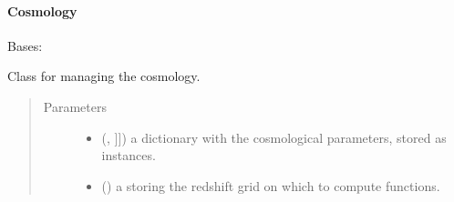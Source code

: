\documentclass[letterpaper,10pt,english]{sphinxmanual}
\begin{document}
\paragraph{Cosmology}
\label{\detokenize{api/seyfert.cosmology.cosmology.Cosmology:cosmology}}\label{\detokenize{api/seyfert.cosmology.cosmology.Cosmology::doc}}

\begin{fulllineitems}
\label{\detokenize{api/seyfert.cosmology.cosmology.Cosmology:seyfert.cosmology.cosmology.Cosmology}}
\sphinxAtStartPar
Bases: 

\sphinxAtStartPar
Class for managing the cosmology.
\begin{quote}\begin{description}
\item[{Parameters}] \leavevmode\begin{itemize}
\item {} 
\sphinxAtStartPar
{} (\sphinxcode{\sphinxupquote{Optional}}{[}\sphinxcode{\sphinxupquote{Dict}}{[}, {\hyperref[\detokenize{api/seyfert.cosmology.parameter.PhysicalParameter:seyfert.cosmology.parameter.PhysicalParameter}]{}}{]}{]}) \textendash{} a dictionary with the cosmological parameters, stored as {\hyperref[\detokenize{api/seyfert.cosmology.parameter.PhysicalParameter:seyfert.cosmology.parameter.PhysicalParameter}]{}} instances.

\item {} 
\sphinxAtStartPar
{} (\sphinxcode{\sphinxupquote{Optional}}{[}\sphinxcode{\sphinxupquote{ndarray}}{]}) \textendash{} a  storing the redshift grid on which to compute functions.


\end{itemize}
\end{description}
\end{quote}
\end{fulllineitems}
\end{document}
